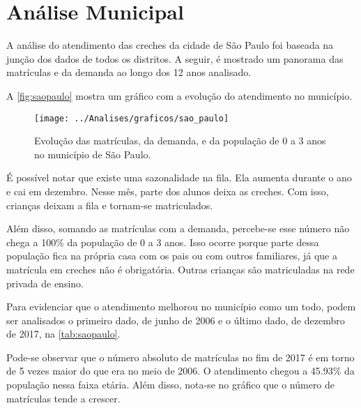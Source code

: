 \chapter{Análise Municipal}
\label{cap:sp}

\lettrine{A}{} análise do atendimento das creches da cidade de São Paulo foi baseada na junção dos dados de todos os distritos. A seguir, é mostrado um panorama das matrículas e da demanda ao longo dos 12 anos analisado.

A \autoref{fig:saopaulo} mostra um gráfico com a evolução do atendimento no município.

\begin{figure}[H]
	\centering
	\texttt{[image: ../Analises/graficos/sao\_paulo]}
	\caption{Evolução das matrículas, da demanda, e da população de 0 a 3 anos no município de São Paulo.}
	\label{fig:saopaulo}
\end{figure}

É possível notar que existe uma sazonalidade na fila. Ela aumenta durante o ano e cai em dezembro. Nesse mês, parte dos alunos deixa as creches. Com isso, crianças deixam a fila e tornam-se matriculados.

Além disso, somando as matrículas com a demanda, percebe-se esse número não chega a 100\% da população de 0 a 3 anos. Isso ocorre porque parte dessa população fica na própria casa com os pais ou com outros familiares, já que a matrícula em creches não é obrigatória. Outras crianças são matriculadas na rede privada de ensino.

Para evidenciar que o atendimento melhorou no município como um todo, podem ser analisados o primeiro dado, de junho de 2006 e o último dado, de dezembro de 2017, na \autoref{tab:saopaulo}.

Pode-se observar que o número absoluto de matrículas no fim de 2017 é em torno de 5 vezes maior do que era no meio de 2006. O atendimento chegou a 45.93\% da população nessa faixa etária. Além disso, nota-se no gráfico que o número de matrículas tende a crescer.

